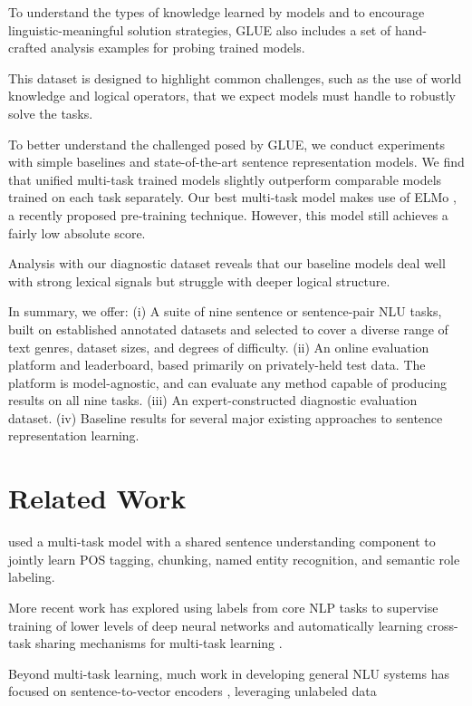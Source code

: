 To understand the types of knowledge learned by models and to encourage linguistic-meaningful solution strategies, GLUE also includes a set of hand-crafted analysis examples for probing trained models. 

This dataset is designed to highlight common challenges, such as the use of world knowledge and logical operators, that we expect models must handle to robustly solve the tasks.

To better understand the challenged posed by GLUE, we conduct experiments with simple baselines and state-of-the-art sentence representation models. We find that unified multi-task trained models slightly outperform comparable models trained on each task separately. Our best multi-task model makes use of ELMo \citep{peters2018deep}, a recently proposed pre-training technique. However, this model still achieves a fairly low absolute score.

Analysis with our diagnostic dataset reveals that our baseline models deal well with strong lexical signals but struggle with deeper logical structure.

In summary, we offer: (i) A suite of nine sentence or sentence-pair NLU tasks, built on established annotated datasets and selected to cover a diverse range of text genres, dataset sizes, and degrees of difficulty. (ii) An online evaluation platform and leaderboard, based primarily on privately-held test data. The platform is model-agnostic, and can evaluate any method capable of producing results on all nine tasks. (iii) An expert-constructed diagnostic evaluation dataset. (iv) Baseline results for several major existing approaches to sentence representation learning.

\section{Related Work}
\label{sec:related}
\citet{collobert2011natural} used a multi-task model with a shared sentence understanding component to jointly learn POS tagging, chunking, named entity recognition, and semantic role labeling.

More recent work has explored using labels from core NLP tasks to supervise training of lower levels of deep neural networks \citep{sogaard2016deep,hashimoto2016joint} and automatically learning cross-task sharing mechanisms for multi-task learning \citep{ruder2017sluice}.

Beyond multi-task learning, much work in developing general NLU systems has focused on sentence-to-vector encoders \citep[][ i.a.]{pmlr-v32-le14,kiros2015skip}, leveraging unlabeled data 

